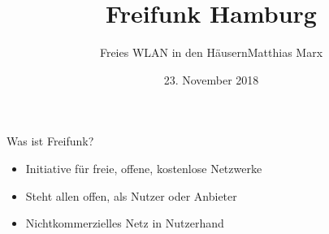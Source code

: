 \documentclass[t]{beamer}
\title{Freifunk Hamburg}
\author{Freies WLAN in den Häusern\newline\newline\newline\newline\newline\newline\newline\newline Matthias Marx}
\date{23. November 2018}
\begin{document}
  \maketitle
  
  \begin{frame}{Was ist Freifunk?}
    \begin{itemize}
      \item Initiative für freie, offene, kostenlose Netzwerke
      \item Steht allen offen, als Nutzer oder Anbieter
      \item Nichtkommerzielles Netz in Nutzerhand
    \end{itemize}
  \end{frame}
  
\end{document}
